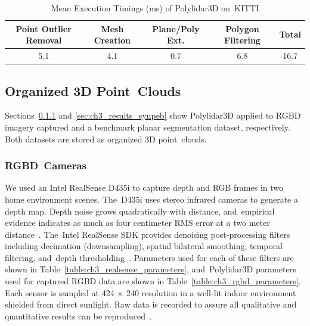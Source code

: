 \begin{table}[H]
\centering
\caption{Mean Execution Timings (ms) of Polylidar3D on~KITTI}
\label{table:ch3_kitti_timings}
\begin{tabular}{@{}ccccc@{}}
\toprule
\textbf{Point Outlier Removal} &\textbf{ Mesh Creation} & \textbf{Plane/Poly Ext.}  & \textbf{Polygon Filtering} & \textbf{Total}   \\ \midrule
5.1           &    4.1             & 0.7             & 6.8                 & 16.7 \\ \bottomrule
\end{tabular}
\end{table}
\unskip

\subsection{Organized 3D Point~Clouds}\label{sec:ch3_results_orgnaized}

Sections~\ref{sec:ch3_results_rgbd} and \ref{sec:ch3_results_synpeb} show Polylidar3D applied to \ac{RGBD} imagery captured and a benchmark planar segmentation dataset, respectively.  Both datasets are stored as organized 3D point~clouds.

\subsubsection{RGBD~Cameras}\label{sec:ch3_results_rgbd} %

We used an Intel RealSense D435i to capture depth and RGB frames in two home environment scenes. The~D435i uses stereo infrared cameras to generate a depth map.  Depth noise grows quadratically with distance, and~empirical evidence indicates as much as four centimeter RMS error at a two meter distance~\cite{ahn_analysis_2019}. The~Intel RealSense SDK provides denoising post-processing filters including decimation (downsampling), spatial bilateral smoothing, temporal filtering, and~depth thresholding~\cite{noauthor_github_2019-1}. Parameters used for each of these filters are shown in Table~\ref{table:ch3_realsense_parameters}, and~Polylidar3D parameters used for captured \ac{RGBD} data are shown in Table~\ref{table:ch3_rgbd_parameters}. Each sensor is sampled at 424 $\times$ 240 resolution in a well-lit indoor environment shielded from direct sunlight. Raw data is recorded to assure all qualitative and quantitative results can be reproduced~\cite{Castagno_Github_Polylidar3D_RealSense}.  

